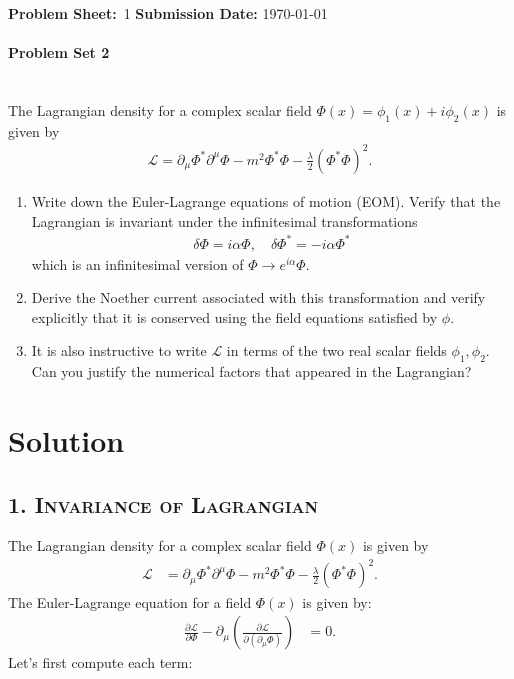 {\large\textbf{Problem Sheet:}\ \textsc{1} \hspace{\hfill} \large\textbf{Submission Date:} \today\\
	\hline\hline
\paragraph*{Problem Set 2} %
\\
The Lagrangian density for a complex scalar field $\displaystyle\Phi(x) = \phi_1(x) + i\phi_2(x)$ is given by
    \begin{align*}
        \mathcal{L} = \partial_\mu \Phi^* \partial^\mu \Phi - m^2 \Phi^* \Phi - \frac{\lambda}{2} (\Phi^* \Phi)^2.
    \end{align*}
    \begin{enumerate}
        \item Write down the Euler-Lagrange equations of motion (EOM). Verify that the Lagrangian is invariant under the infinitesimal transformations
    \begin{align*}
        \delta \Phi = i\alpha \Phi, \quad \delta \Phi^* = -i\alpha \Phi^*
    \end{align*}
    which is an infinitesimal version of $\displaystyle\Phi \rightarrow e^{i\alpha} \Phi$.
    \item Derive the Noether current associated with this transformation and verify explicitly that it is conserved using the field equations satisfied by $\phi$.
    \item It is also instructive to write $\mathcal{L}$ in terms of the two real scalar fields $\phi_1, \phi_2$. Can you justify the numerical factors that appeared in the Lagrangian?
    \end{enumerate}
\bigskip\bigskip\hline\hline\bigskip
\section*{Solution}
\subsection*{\scshape\bf 1. Invariance of Lagrangian}
The Lagrangian density for a complex scalar field $\Phi(x)$ is given by
\begin{align}
    \mathcal{L} &= \partial_\mu \Phi^* \partial^\mu \Phi - m^2 \Phi^* \Phi - \frac{\lambda}{2} (\Phi^* \Phi)^2. \label{eq:lagrangian-density-complex-scalar}
\end{align}
The Euler-Lagrange equation for a field $\Phi(x)$ is given by:
\begin{align}
    \frac{\partial \mathcal{L}}{\partial \Phi} - \partial_\mu \left( \frac{\partial \mathcal{L}}{\partial (\partial_\mu \Phi)} \right) &= 0.\label{eq:euler-lagrange-for-fields}
\end{align}
Let's first compute each term:

}

